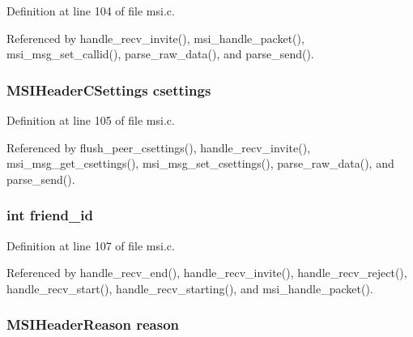 Definition at line 104 of file msi.\+c.



Referenced by handle\+\_\+recv\+\_\+invite(), msi\+\_\+handle\+\_\+packet(), msi\+\_\+msg\+\_\+set\+\_\+callid(), parse\+\_\+raw\+\_\+data(), and parse\+\_\+send().

\hypertarget{struct___m_s_i_message_a4b09316f11dc8e9fe3b3357a6d48db56}{
\subsubsection[{csettings}]{\setlength{\rightskip}{0pt plus 5cm}M\+S\+I\+Header\+C\+Settings csettings}}\label{struct___m_s_i_message_a4b09316f11dc8e9fe3b3357a6d48db56}


Definition at line 105 of file msi.\+c.



Referenced by flush\+\_\+peer\+\_\+csettings(), handle\+\_\+recv\+\_\+invite(), msi\+\_\+msg\+\_\+get\+\_\+csettings(), msi\+\_\+msg\+\_\+set\+\_\+csettings(), parse\+\_\+raw\+\_\+data(), and parse\+\_\+send().

\hypertarget{struct___m_s_i_message_af43a034662e9bcac38e3bf4c9c150c19}{
\subsubsection[{friend\+\_\+id}]{\setlength{\rightskip}{0pt plus 5cm}int friend\+\_\+id}}\label{struct___m_s_i_message_af43a034662e9bcac38e3bf4c9c150c19}


Definition at line 107 of file msi.\+c.



Referenced by handle\+\_\+recv\+\_\+end(), handle\+\_\+recv\+\_\+invite(), handle\+\_\+recv\+\_\+reject(), handle\+\_\+recv\+\_\+start(), handle\+\_\+recv\+\_\+starting(), and msi\+\_\+handle\+\_\+packet().

\hypertarget{struct___m_s_i_message_aec4373dacf43cd56b5e67d2b04b63f5a}{
\subsubsection[{reason}]{\setlength{\rightskip}{0pt plus 5cm}M\+S\+I\+Header\+Reason reason}}\label{struct___m_s_i_message_aec4373dacf43cd56b5e67d2b04b63f5a}


